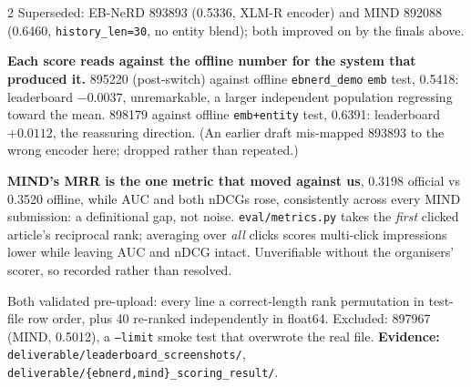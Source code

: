 \documentclass[10pt,a4paper]{article}
\begin{document}
\begin{multicols}{2}
Superseded: EB-NeRD 893893 (0.5336, XLM-R encoder) and MIND 892088 (0.6460,
\texttt{history\_len=30}, no entity blend); both improved on by the finals above.

\textbf{Each score reads against the offline number for the system that produced it.} 895220
(post-switch) against offline \texttt{ebnerd\_demo} \texttt{emb} test, 0.5418: leaderboard
\textbf{$-0.0037$}, unremarkable, a larger independent population regressing toward the mean. 898179
against offline \texttt{emb+entity} test, 0.6391: leaderboard \textbf{$+0.0112$}, the reassuring
direction. (An earlier draft mis-mapped 893893 to the wrong encoder here; dropped rather than
repeated.)

\textbf{MIND's MRR is the one metric that moved against us}, 0.3198 official vs 0.3520 offline, while
AUC and both nDCGs rose, consistently across every MIND submission: a definitional gap, not noise.
\texttt{eval/metrics.py} takes the \emph{first} clicked article's reciprocal rank; averaging over
\emph{all} clicks scores multi-click impressions lower while leaving AUC and nDCG intact. Unverifiable
without the organisers' scorer, so recorded rather than resolved.

Both validated pre-upload: every line a correct-length rank permutation in test-file row order, plus 40
re-ranked independently in float64. Excluded: 897967 (MIND, 0.5012), a \texttt{--limit} smoke test that
overwrote the real file. \textbf{Evidence:} \texttt{deliverable/leaderboard\_screenshots/},
\texttt{deliverable/\{ebnerd,mind\}\_scoring\_result/}.

\end{multicols}
\end{document}
